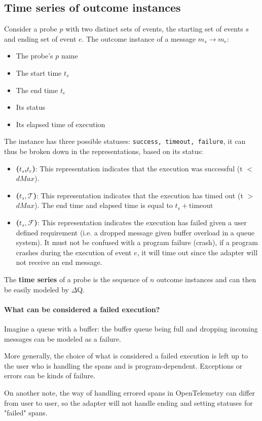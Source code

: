 \subsection{Time series of outcome instances}
    Consider a probe $p$ with two distinct sets of events, the starting set of events $s$ and ending set of event $e$. The outcome instance of a message $m_s \rightarrow m_e$:
    \begin{itemize}
        \item The probe's $p$ name
        \item The start time $t_s$
        \item The end time $t_e$
        \item Its status 
        \item Its elapsed time of execution
    \end{itemize}
    The instance has three possible statuses: \texttt{success, timeout, failure}, it can thus be broken down in the representations, based on its status:
    \begin{itemize}
        \item \textbf{($t_s$,$t_e$)}: This representation indicates that the execution was successful (t $<$ $dMax$). 
        \item \textbf{($t_s, \mathcal{T}$)}: This representation indicates that the execution has timed out (t $>$ $dMax$). The end time and elapsed time is equal to $t_s + \text{timeout}$ 
        \item \textbf{($t_s, \mathcal{F}$)}: This representation indicates the execution has failed given a user defined requirement (i.e. a dropped message given buffer overload in a queue system). It must not be confused with a program failure (crash), if a program crashes during the execution of event $e$, it will time out since the adapter will not receive an end message.
    \end{itemize}
    The \textbf{time series} of a probe is the sequence of $n$ outcome instances and can then be easily modeled by $\Delta$Q.
    \paragraph{What can be considered a failed execution?} Imagine a queue with a buffer: the buffer queue being full and dropping incoming messages can be modeled as a failure.

    More generally, the choice of what is considered a failed execution is left up to the user who is handling the spans and is program-dependent. Exceptions or errors can be kinds of failure. 

    On another note, the way of handling errored spans in OpenTelemetry can differ from user to user, so the adapter will not handle ending and setting statuses for "failed" spans.
   
